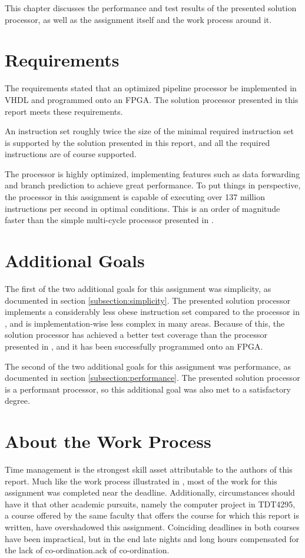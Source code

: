 This chapter discusses the performance and test results of the presented solution processor, as well as the assignment itself and the work process around it.

\section{Requirements}

The requirements stated that an optimized pipeline processor be implemented in VHDL and programmed onto an FPGA.
The solution processor presented in this report meets these requirements.

An instruction set roughly twice the size of the minimal required instruction set is supported by the solution presented in this report, and all the required instructions are of course supported.

The processor is highly optimized, implementing features such as data forwarding and branch prediction to achieve great performance.
To put things in perspective, the processor in this assignment is capable of executing over 137 million instructions per second in optimal conditions.
This is an order of magnitude faster than the simple multi-cycle processor presented in \cite{assignment-1}.

\section{Additional Goals}

The first of the two additional goals for this assignment was simplicity, as documented in section \vref{subsection:simplicity}.
The presented solution processor implements a considerably less obese instruction set compared to the processor in \cite{assignment-1}, and is implementation-wise less complex in many areas.
Because of this, the solution processor has achieved a better test coverage than the processor presented in \cite{assingment-1}, and it has been successfully programmed onto an FPGA.

The second of the two additional goals for this assignment was performance, as documented in section \vref{subsection:performance}.
The presented solution processor is a performant processor, so this additional goal was also met to a satisfactory degree.

\section{About the Work Process}

Time management is the strongest skill asset attributable to the authors of this report.
Much like the work process illustrated in \cite{assignment-1}, most of the work for this assignment was completed near the deadline.
Additionally, circumstances should have it that other academic pursuits, namely the computer project in TDT4295, a course offered by the same faculty that offers the course for which this report is written, have overshadowed this assignment.
Coinciding deadlines in both courses have been impractical, but in the end late nights and long hours compensated for the lack of co-ordination.ack of co-ordination.
